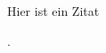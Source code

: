 \documentclass{svmono}
\begin{document}
Hier ist ein Zitat \cite[1.13.3]{sakai:1971}

\cite[Chapter III]{takesaki:1979}.

  
\end{document}
